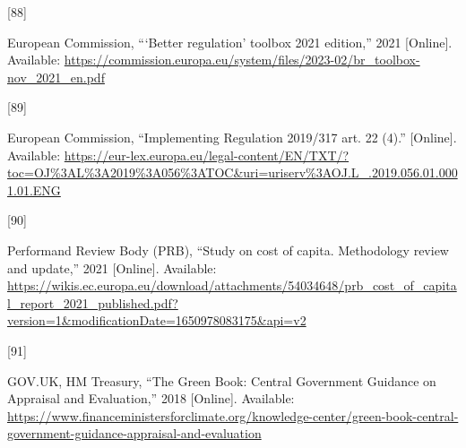 \documentclass[
  11pt,
  a4paper,
]{book}
\newlength{\cslhangindent}
\newlength{\csllabelwidth}
\newlength{\cslentryspacingunit} %
\newenvironment{CSLReferences}[2] %
 {%
  \setlength{\parindent}{0pt}
  \ifodd #1
  \let\oldpar\par
  \def\par{\hangindent=\cslhangindent\oldpar}
  \fi
  \setlength{\parskip}{#2\cslentryspacingunit}
 }%
 {}
\newcommand{\CSLLeftMargin}[1]{\parbox[t]{\csllabelwidth}{#1}}
\newcommand{\CSLRightInline}[1]{\parbox[t]{\linewidth - \csllabelwidth}{#1}\break}
\begin{document}
\begin{CSLReferences}{0}{0}
\leavevmode{}%
\CSLLeftMargin{{[}88{]} }%
\CSLRightInline{European Commission, {``{`{Better} regulation'} toolbox
\textendash{{November}} 2021 edition,''} 2021 {[}Online{]}. Available:
\url{https://commission.europa.eu/system/files/2023-02/br_toolbox-nov_2021_en.pdf}}

\leavevmode{}%
\CSLLeftMargin{{[}89{]} }%
\CSLRightInline{European Commission, {``Implementing {Regulation}
2019/317 art. 22 (4).''} {[}Online{]}. Available:
\url{https://eur-lex.europa.eu/legal-content/EN/TXT/?toc=OJ\%3AL\%3A2019\%3A056\%3ATOC\&uri=uriserv\%3AOJ.L_.2019.056.01.0001.01.ENG}}

\leavevmode{}%
\CSLLeftMargin{{[}90{]} }%
\CSLRightInline{Performand Review Body (PRB), {``Study on cost of
capita. {Methodology} review and update,''} 2021 {[}Online{]}.
Available:
\url{https://wikis.ec.europa.eu/download/attachments/54034648/prb_cost_of_capital_report_2021_published.pdf?version=1\&modificationDate=1650978083175\&api=v2}}

\leavevmode{}%
\CSLLeftMargin{{[}91{]} }%
\CSLRightInline{GOV.UK, HM Treasury, {``The {Green Book}: {Central
Government Guidance} on {Appraisal} and {Evaluation},''} 2018
{[}Online{]}. Available:
\url{https://www.financeministersforclimate.org/knowledge-center/green-book-central-government-guidance-appraisal-and-evaluation}}

\end{CSLReferences}


\backmatter
\end{document}
